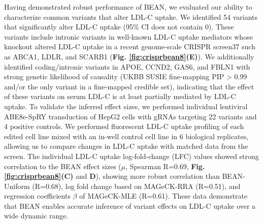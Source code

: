 \documentclass[a4paper, titlepage, openright]{book}
\begin{document}
Having demonstrated robust performance of BEAN, we evaluated our ability to characterize common variants that alter LDL-C uptake. We identified 54 variants that significantly alter LDL-C uptake (95\% CI does not contain 0). These variants include intronic variants in well-known LDL-C uptake mediators whose knockout altered LDL-C uptake in a recent genome-scale CRISPR screen37 such as ABCA1, LDLR, and SCARB1 (\textbf{Fig. \ref{fig:crisprbean8}(E)}). We additionally identified coding/intronic variants in APOE, CCND2, GAS6, and FBLN1 with strong genetic likelihood of causality (UKBB SUSIE fine-mapping PIP > 0.99 and/or the only variant in a fine-mapped credible set\citep{graham2021power}), indicating that the effect of these variants on serum LDL-C is at least partially mediated by LDL-C uptake. To validate the inferred effect sizes, we performed individual lentiviral ABE8e-SpRY transduction of HepG2 cells with gRNAs targeting 22 variants and 4 positive controls. We performed fluorescent LDL-C uptake profiling of each edited cell line mixed with an in-well control cell line in 6 biological replicates, allowing us to compare changes in LDL-C uptake with matched data from the screen. The individual LDL-C uptake log-fold-change (LFC) values showed strong correlation to the BEAN effect sizes ($\mu$, Spearman R=0.69, \textbf{Fig. \ref{fig:crisprbean8}(C)} and \textbf{D}), showing more robust correlation than BEAN-Uniform (R=0.68), log fold change based on MAGeCK-RRA (R=0.51), and regression coefficients $\beta$ of MAGeCK-MLE (R=0.61). These data demonstrate that BEAN enables accurate inference of variant effects on LDL-C uptake over a wide dynamic range.
\end{document}
